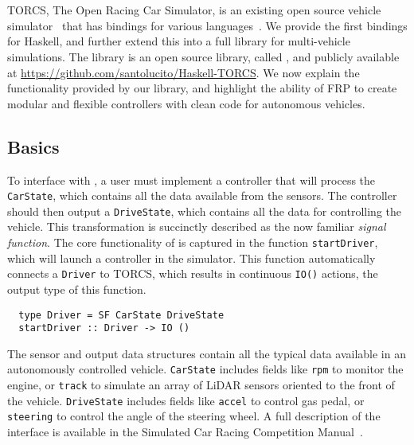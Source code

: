 \section{\ourLib}
TORCS, The Open Racing Car Simulator, is an existing open source vehicle simulator~\cite{torcs} that has bindings for various languages~\cite{SCRC}.
We provide the first bindings for Haskell, and further extend this into a full library for multi-vehicle simulations.
The library is an open source library, called \ourLib, and publicly available at \url{https://github.com/santolucito/Haskell-TORCS}.
We now explain the functionality provided by our library, and highlight the ability of FRP to create modular and flexible controllers with clean code for autonomous vehicles.

\subsection{Basics}

To interface with \ourLib, a user must implement a controller that will process the \texttt{CarState}, which contains all the data available from the sensors.
The controller should then output a \texttt{DriveState}, which contains all the data for controlling the vehicle.
This transformation is succinctly described as the now familiar \textit{signal function}.
The core functionality of \ourLib is captured in the function \texttt{startDriver}, which will launch a controller in the simulator.
This function automatically connects a \texttt{Driver} to TORCS, which results in continuous \texttt{IO()} actions, the output type of this function.

\vspace{0.2em}
\begin{lstlisting}
  type Driver = SF CarState DriveState
  startDriver :: Driver -> IO ()
\end{lstlisting}
\vspace{0.2em}

\noindent The sensor and output data structures contain all the typical data available in an autonomously controlled vehicle.
\texttt{CarState} includes fields like \texttt{rpm} to monitor the engine, or \texttt{track} to simulate an array of LiDAR sensors oriented to the front of the vehicle.
\texttt{DriveState} includes fields like \texttt{accel} to control gas pedal, or \texttt{steering} to control the angle of the steering wheel.
A full description of the interface is available in the Simulated Car Racing Competition Manual~\cite{SCRCManual}. 


